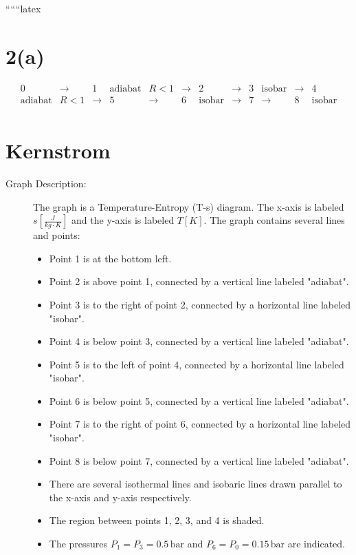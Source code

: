 
``````latex


\section*{2(a)}

\[
\begin{array}{cccccccccccc}
0 & \rightarrow & 1 & \text{adiabat} & R < 1 & \rightarrow & 2 & \rightarrow & 3 & \text{isobar} & \rightarrow & 4 \\
\text{adiabat} & R < 1 & \rightarrow & 5 & \rightarrow & 6 & \text{isobar} & \rightarrow & 7 & \rightarrow & 8 & \text{isobar} \\
\end{array}
\]

\section*{Kernstrom}

\begin{description}
\item[Graph Description:] The graph is a Temperature-Entropy (T-s) diagram. The x-axis is labeled $s \left[ \frac{J}{kg \cdot K} \right]$ and the y-axis is labeled $T [K]$. The graph contains several lines and points:
\begin{itemize}
    \item Point 1 is at the bottom left.
    \item Point 2 is above point 1, connected by a vertical line labeled "adiabat".
    \item Point 3 is to the right of point 2, connected by a horizontal line labeled "isobar".
    \item Point 4 is below point 3, connected by a vertical line labeled "adiabat".
    \item Point 5 is to the left of point 4, connected by a horizontal line labeled "isobar".
    \item Point 6 is below point 5, connected by a vertical line labeled "adiabat".
    \item Point 7 is to the right of point 6, connected by a horizontal line labeled "isobar".
    \item Point 8 is below point 7, connected by a vertical line labeled "adiabat".
    \item There are several isothermal lines and isobaric lines drawn parallel to the x-axis and y-axis respectively.
    \item The region between points 1, 2, 3, and 4 is shaded.
    \item The pressures $P_1 = P_3 = 0.5 \, \text{bar}$ and $P_6 = P_0 = 0.15 \, \text{bar}$ are indicated.
\end{itemize}
\end{description}

